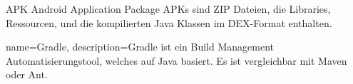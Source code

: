{APK}
{Android Application Package}
{
	APKs sind ZIP Dateien, die Libraries, Ressourcen, und die kompilierten Java Klassen im DEX-Format enthalten.
}


{
	name={Gradle},
	description={Gradle ist ein Build Management Automatisierungstool, welches auf Java basiert. Es ist vergleichbar mit Maven oder Ant.}
}